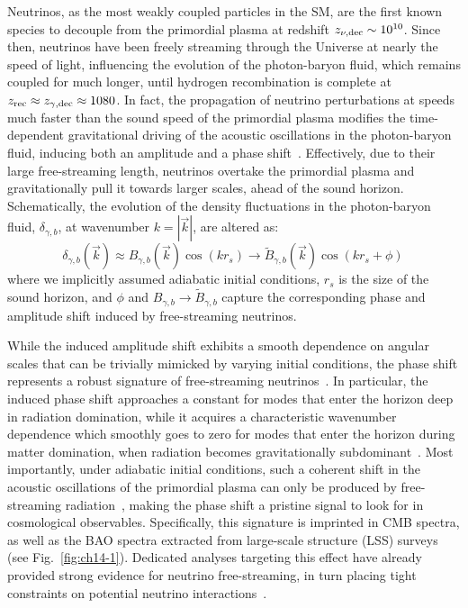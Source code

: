 \noindent Neutrinos, as the most weakly coupled particles in the SM, are the first known species to decouple from the primordial plasma at redshift $z_{\nu,\rm dec}\sim 10^{10}$. Since then, neutrinos have been freely streaming through the Universe at nearly the speed of light, influencing the evolution of the photon-baryon fluid, which remains coupled for much longer, until hydrogen recombination is complete at $z_{\rm rec}\approx z_{\gamma,\rm dec}\approx1080$. In fact, the propagation of neutrino perturbations at speeds much faster than the sound speed of the primordial plasma modifies the time-dependent gravitational driving of the acoustic oscillations in the photon-baryon fluid, inducing both an amplitude and a phase shift~\cite{Bashinsky:2003tk,Baumann:2015rya}. Effectively, due to their large free-streaming length, neutrinos  overtake the primordial plasma and gravitationally pull it towards larger scales, ahead of the sound horizon. Schematically, the evolution of the density fluctuations in the photon-baryon fluid, $\delta_{\gamma,b}$, at wavenumber $k=|\vec{k}|$, are altered as:
\begin{equation}
    \delta_{\gamma,b}(\vec{k}) \approx B_{\gamma,b}(\vec{k}) \cos(k r_s) \to \tilde{B}_{\gamma,b}(\vec{k}) \cos(k r_s + \phi)\,\label{eq:ch14-phase0}
\end{equation}
where we implicitly assumed adiabatic initial conditions, $r_s$ is the size of the sound horizon, and $\phi$ and $B_{\gamma,b} \to \tilde{B}_{\gamma,b}$ capture the corresponding phase and amplitude shift induced by free-streaming neutrinos.

While the induced amplitude shift exhibits a smooth dependence on angular scales that can be trivially mimicked by varying initial conditions, the phase shift represents a robust signature of free-streaming neutrinos~\citep{Bashinsky:2003tk,Baumann:2015rya}. In particular, the induced phase shift approaches a constant for modes that enter the horizon deep in radiation domination, while it acquires a characteristic wavenumber dependence which smoothly goes to zero for modes that enter the horizon during matter domination, when
radiation becomes gravitationally subdominant~\cite{Baumann:2015rya}. Most importantly, under adiabatic initial conditions, such a coherent shift in the acoustic oscillations of the primordial plasma can only be produced by free-streaming radiation~\cite{Baumann:2015rya}, making the phase shift a pristine signal to look for in cosmological observables. Specifically, this signature is imprinted in CMB spectra, as well as the BAO spectra extracted from large-scale structure (LSS) surveys (see Fig.~\ref{fig:ch14-1}). Dedicated analyses targeting this effect have already provided strong evidence for neutrino free-streaming, in turn placing tight constraints on potential neutrino interactions~\cite{Follin:2015hya,Montefalcone:2025unv,Choi:2018gho,Whitford:2024ecj,Saravanan:2025cyi,montefalcone25}.

